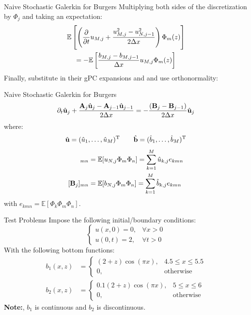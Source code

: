 \documentclass[
    pdf,
    11pt,
    xcolor={svgnames},
  ]{beamer}
\begin{document}
\begin{frame}{Naive Stochastic Galerkin for Burgers}
    Multiplying both sides of the discretization by $\Phi_j$ and taking an expectation:
    \begin{multline*}
        \mathbb{E}\left[
            \left(
                \pdv{}{t} u_{M,j} + \frac{u_{M,j}^2-u_{N,j-1}^2}{2\Delta x}
            \right) \Phi_m(z)
        \right] \\
        = -\mathbb{E} \left[
            \frac{b_{M,j} - b_{M,j-1}}{\Delta x} u_{M,j} \Phi_m(z)
        \right]
    \end{multline*}
    \pause
    Finally, substitute in their gPC expansions and and use orthonormality:
\end{frame}
\begin{frame}{Naive Stochastic Galerkin for Burgers}
   \begin{equation}
       \partial_t \hat{\vb{u}}_j + \frac{\vb{A}_j \hat{\vb{u}}_j - \vb{A}_{j-1} \hat{\vb{u}}_{j-1}}{2\Delta x} = -\frac{(\vb{B}_j - \vb{B}_{j-1})}{2\Delta x}\hat{\vb{u}}_j
   \end{equation} 
   where:
   \begin{equation*}
       \hat{\vb{u}} = (\hat{u}_1, \dots, \hat{u}_M)^\mathrm{T}
       \qquad
       \hat{\vb{b}} = (\hat{b}_1, \dots, \hat{b}_M)^\mathrm{T}
   \end{equation*}
   \begin{align*}
       [\vb{A}_j]_{mn} &= \mathbb{E}[u_{N,j} \Phi_m \Phi_n] = \sum_{k=1}^M \hat{u}_{k,j} e_{kmn} \\
       [\vb{B}_j]_{mn} &= \mathbb{E}[b_{N,j} \Phi_m \Phi_n] = \sum_{k=1}^M \hat{b}_{k,j} e_{kmn}
   \end{align*}
   with $e_{kmn} = \mathbb{E}[\Phi_k \Phi_m \Phi_n]$.
\end{frame}

\begin{frame}{Test Problems}
    Impose the following initial/boundary conditions:
    \[
    \begin{cases}
        u(x,0) = 0, &\forall x > 0 \\
        u(0,t) = 2, &\forall t > 0
    \end{cases}
    \]
    With the following bottom functions:
    \begin{align*}
        b_1(x,z)
        &=
        \begin{cases}
            (2+z) \cos(\pi x), & 4.5 \leq x \leq 5.5 \\
            0, & \text{otherwise}
        \end{cases} \\
        b_2(x,z)
        &=
        \begin{cases}
            0.1(2+z) \cos(\pi x), & 5 \leq x \leq 6 \\
            0, & \text{otherwise}
        \end{cases}
    \end{align*}
    {\bf Note:}, $b_1$ is continuous and $b_2$ is discontinuous.
\end{frame}
\end{document}
